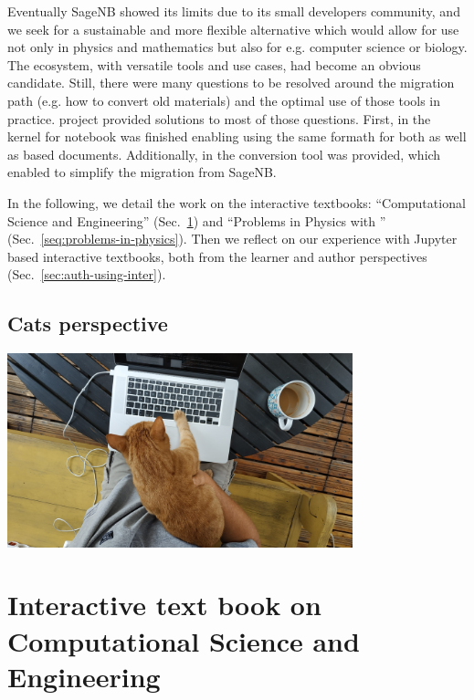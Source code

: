 \documentclass{deliverablereport}
\newcommand{\sagenb}{SageNB\xspace}
\begin{document}
Eventually \sagenb showed its limits due to its small developers
community, and we seek for a sustainable and more flexible alternative
which would allow for use not only in physics and mathematics but also
for e.g. computer science or biology. The \Jupyter ecosystem, with
versatile tools and use cases, had become an obvious candidate. Still,
there were many questions to be resolved around the migration path
(e.g. how to convert old materials) and the optimal use of those tools
in practice.  \ODK project provided solutions to most of those
questions. First, in  the
\SageMath kernel for \Jupyter notebook was finished enabling using the
same formath for both \Sage as well as \Python based
documents. Additionally, in  the
conversion tool was provided, which enabled to simplify the migration
from \sagenb. 

In the following, we detail the work on the interactive textbooks:
``Computational Science and Engineering'' (Sec.~\ref{sec:computational-science-and-engineering})
and ``Problems in Physics with \SageMath'' (Sec.~\ref{seq:problems-in-physics}).
Then we reflect on our experience with Jupyter based interactive
textbooks, both from the learner and author perspectives (Sec.~\ref{sec:auth-using-inter}).

\subsection{Cats perspective}
\includegraphics[width=10cm]{cat.jpg}




\section{Interactive text book on Computational Science and Engineering}
\label{sec:computational-science-and-engineering}
\end{document}
